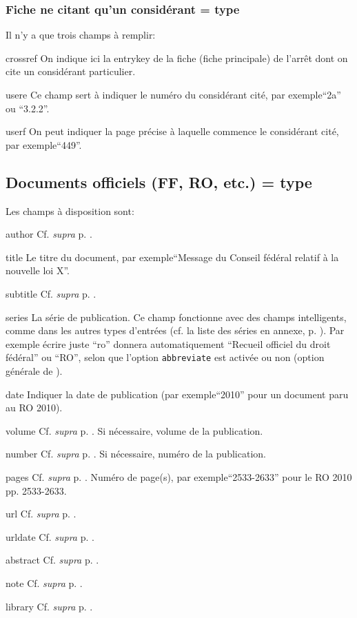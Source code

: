 \documentclass[a4paper]{ltxdockit}[2011/03/25]
\newcommand{\bbltx}{\sty{bib{\-}la{\-}tex}\xspace}
\newcommand{\supra}{\emph{supra}\xspace}
\newcommand{\Cf}{\textnormal{Cf. }}
\newcommand{\cf}{cf.\xspace}
\newcommand{\GM}{\enquote}
\newcommand{\pex}{\textnormal{par exemple}\xspace}
\newcommand{\Pex}{\textnormal{Par exemple}\xspace}
\begin{document}
\subsubsection{Fiche ne citant qu'un considérant = type }

Il n'y a que trois champs à remplir:
\begin{marglist}
\item[crossref] On indique ici la entrykey de la fiche  (fiche principale) de l'arrêt dont on cite un considérant particulier.
\item[usere] Ce champ sert à indiquer le numéro du considérant cité, \pex \GM{2a} ou \GM{3.2.2}.
\item[userf] On peut indiquer la page précise à laquelle commence le considérant cité, \pex \GM{449}.
\end{marglist}


\subsection{Documents officiels (FF, RO, etc.) = type }


Les champs à disposition sont:
\begin{marglist}
\item[author] \Cf \supra p. \pageref{author}.
\item[title] Le titre du document, \pex \GM{Message du Conseil fédéral relatif à la nouvelle loi X}.
\item[subtitle] \Cf \supra p. \pageref{subtitle}.
\item[series] La série de publication. Ce champ fonctionne avec des champs intelligents, comme dans les autres types d'entrées (\cf la liste des séries en annexe, p. \pageref{listecollections}). \Pex écrire juste \GM{ro} donnera automatiquement \GM{Recueil officiel du droit fédéral} ou \GM{RO}, selon que l'option \verb/abbreviate/ est activée ou non (option générale de \bbltx).
\item[date] Indiquer la date de publication (\pex \GM{2010} pour un document paru au RO 2010).
\item[volume] \Cf \supra p. \pageref{volume}. Si nécessaire, volume de la publication.
\item[number] \Cf \supra p. \pageref{number}. Si nécessaire, numéro de la publication.
\item[pages] \Cf \supra p. \pageref{pages}. Numéro de page(s), \pex \GM{2533-2633} pour le RO 2010 pp. 2533-2633.
\item[url] \Cf \supra p. \pageref{url}.
\item[urldate] \Cf \supra p. \pageref{urldate}.
\item[abstract] \Cf \supra p. \pageref{abstract}. 
\item[note] \Cf \supra p. \pageref{note}.
\item[library] \Cf \supra p. \pageref{library}.
\end{marglist}
\end{document}
